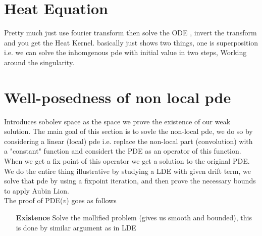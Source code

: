 \section{Heat Equation}
Pretty much just use fourier transform then solve the ODE , invert the transform and you get the Heat Kernel. 
basically just shows two things, one is superposition i.e. we can solve the inhomgenous pde with initial value in two steps,
Working around the singularity.
\section{Well-posedness of non local pde}
Introduces sobolev space as the space we prove the existence of our weak solution.
The main goal of this section is to sovle the non-local pde, we do so by considering a linear (local) pde i.e.
replace the non-local part (convolution) with a "constant" function and considert the PDE as an operator of this function.
When we get a fix point of this operator we get a solution to the original PDE.\\[1ex]
We do the entire thing illustrative by studying a LDE with given drift term, we solve that pde by using a fixpoint iteration, and then prove the necessary bounds 
to apply Aubin Lion. \\[1ex]
The proof of PDE($v$) goes as follows
\begin{enumerate}
  \item[\bf Existence] Solve the mollified problem (gives us smooth and bounded), this is done by similar argument as in LDE 

\end{enumerate}
